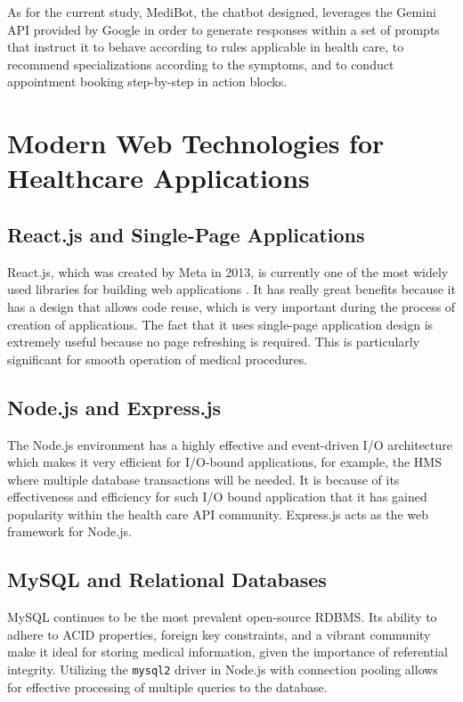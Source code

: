 As for the current study, MediBot, the chatbot designed, leverages the Gemini API provided by Google in order to generate responses within a set of prompts that instruct it to behave according to rules applicable in health care, to recommend specializations according to the symptoms, and to conduct appointment booking step-by-step in action blocks.
\FloatBarrier
\section{Modern Web Technologies for Healthcare Applications}

\subsection{React.js and Single-Page Applications}

React.js, which was created by Meta in 2013, is currently one of the most widely used libraries for building web applications \cite{reactdocs}. It has really great benefits because it has a design that allows code reuse, which is very important during the process of creation of applications. The fact that it uses single-page application design is extremely useful because no page refreshing is required. This is particularly significant for smooth operation of medical procedures.

\subsection{Node.js and Express.js}

The Node.js environment has a highly effective and event-driven I/O architecture which makes it very efficient for I/O-bound applications, for example, the HMS where multiple database transactions will be needed. It is because of its effectiveness and efficiency for such I/O bound application that it has gained popularity within the health care API community. Express.js acts as the web framework for Node.js.

\subsection{MySQL and Relational Databases}

MySQL continues to be the most prevalent open-source RDBMS. Its ability to adhere to ACID properties, foreign key constraints, and a vibrant community make it ideal for storing medical information, given the importance of referential integrity. Utilizing the \texttt{mysql2} driver in Node.js with connection pooling allows for effective processing of multiple queries to the database.

